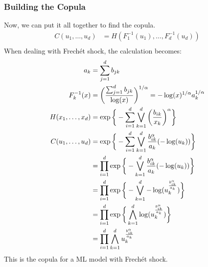 \documentclass[12pt]{article}
\def\inv{^{-1}}
\newcommand{\ds}{\displaystyle}
\theoremstyle{definition}
\theoremstyle{definition}
\begin{document}
\subsubsection{Building the Copula}
Now, we can put it all together to find the copula.
\begin{align*}
    C(u_1,\hdots, u_d)&=H(F_1\inv(u_1),\hdots, F_d\inv(u_d))\\
\end{align*}
When dealing with Frechét shock, the calculation becomes:
\begin{align*}
a_k&=\sum_{j=1}^d{b_{jk}}\\
F_{k}\inv(x)&=\bigg(\frac{\sum_{j=1}^d{b_{jk}}}{\log(x)} \bigg)^{{1}/{\alpha}}=-\log(x)^{1/\alpha}a_k^{1/\alpha}\\
H(x_1,\hdots,x_d)&=\exp\bigg\{ -\sum_{i=1}^d \bigvee_{k=1}^d \bigg( \frac{b_{ik}}{x_k} \bigg)^\alpha \bigg\}\\
     C(u_1,\hdots, u_d)&=\exp\bigg\{ -\sum_{i=1}^d \bigvee_{k=1}^d \frac{b_{ik}^\alpha}{a_k}(-\log(u_k))\bigg\}\\
     &=\prod_{i=1}^d\exp\bigg\{- \bigvee_{k=1}^d \frac{b_{ik}^\alpha}{a_k}(-\log(u_k))\bigg\}\\
     &=\prod_{i=1}^d\exp\bigg\{- \bigvee_{k=1}^d -\log(u_k^\frac{b_{ik}^\alpha}{a_k})\bigg\}\\
     &=\prod_{i=1}^d\exp\bigg\{ \bigwedge_{k=1}^d \log(u_k^\frac{b_{ik}^\alpha}{a_k})\bigg\}\\
     \ds&=\prod_{i=1}^d \bigwedge_{k=1}^d u_k^\frac{b_{ik}^\alpha}{a_k}
\end{align*}
This is the copula for a ML model with Frechét shock.
 
 
 
 
 
 
 
 
 
 
 
\end{document}
